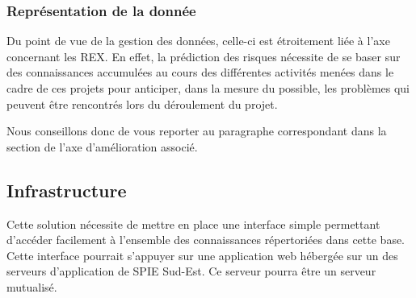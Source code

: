 \subsubsection{Représentation de la donnée}

Du point de vue de la gestion des données, celle-ci est étroitement liée à l’axe concernant les REX. En effet, la prédiction des risques nécessite de se baser sur des connaissances accumulées au cours des différentes activités menées dans le cadre de ces projets pour anticiper, dans la mesure du possible, les problèmes qui peuvent être rencontrés lors du déroulement du projet.

Nous conseillons donc de vous reporter au paragraphe correspondant dans la section de l’axe d’amélioration associé.

\subsection{Infrastructure}

Cette solution nécessite de mettre en place une interface simple permettant d’accéder facilement à l’ensemble des connaissances répertoriées dans cette base. Cette interface pourrait s’appuyer sur une application web hébergée sur un des serveurs d’application de SPIE Sud-Est. Ce serveur pourra être un serveur mutualisé.
